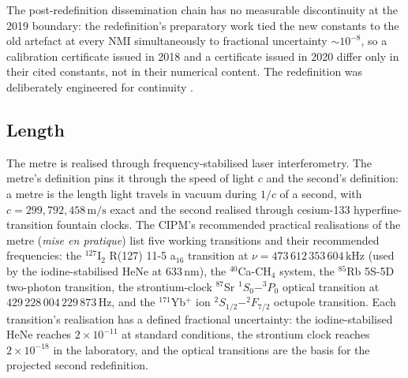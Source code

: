 The post-redefinition dissemination chain has no measurable
discontinuity at the 2019 boundary: the redefinition's preparatory
work tied the new constants to the old artefact at every NMI
simultaneously to fractional uncertainty $\sim 10^{-8}$, so a
calibration certificate issued in 2018 and a certificate issued
in 2020 differ only in their cited constants, not in their
numerical content. The redefinition was deliberately engineered
for continuity \cite{std:bipm-si2019}.



\subsection{Length}

The metre is realised through frequency-stabilised laser
interferometry. The metre's definition pins it through the speed of
light $c$ and the second's definition: a metre is the length light
travels in vacuum during $1/c$ of a second, with $c = 299{,}792{,}458
\,\si{\meter\per\second}$ exact and the second realised through
cesium-133 hyperfine-transition fountain clocks. The CIPM's
recommended practical realisations of the metre
(\textit{mise en pratique}) list five working transitions and their
recommended frequencies: the $^{127}$I$_{2}$ R(127) 11-5 a$_{16}$
transition at $\nu = 473\,612\,353\,604\,\si{\kilo\hertz}$
(used by the iodine-stabilised HeNe at $633\,\si{\nano\meter}$), the
$^{40}$Ca-CH$_{4}$ system, the $^{85}$Rb 5S-5D two-photon
transition, the strontium-clock $^{87}$Sr $^{1}\!S_{0}{-}^{3}\!P_{0}$
optical transition at $429\,228\,004\,229\,873\,\si{\hertz}$, and the
$^{171}$Yb$^{+}$ ion $^{2}\!S_{1/2}{-}^{2}\!F_{7/2}$ octupole
transition. Each transition's realisation has a defined
fractional uncertainty: the iodine-stabilised HeNe reaches
$2 \times 10^{-11}$ at standard conditions, the strontium clock
reaches $2 \times 10^{-18}$ in the laboratory, and the optical
transitions are the basis for the projected second redefinition.

